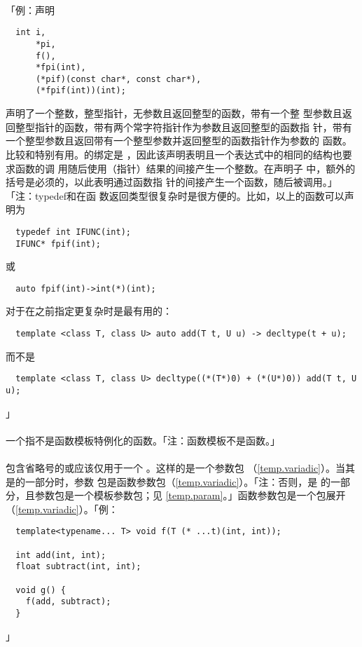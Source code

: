 \paragraph{}
「例：声明
\begin{lstlisting}
  int i,
      *pi,
      f(),
      *fpi(int),
      (*pif)(const char*, const char*),
      (*fpif(int))(int);
\end{lstlisting}
声明了一个整数，整型指针，无参数且返回整型的函数，带有一个整
型参数且返回整型指针的函数，带有两个常字符指针作为参数且返回整型的函数指
针，带有一个整型参数且返回带有一个整型参数并返回整型的函数指针作为参数的
函数。比较和特别有用。的绑定是
，因此该声明表明且一个表达式中的相同的结构也要求函数的调
用随后使用（指针）结果的间接产生一个整数。在声明子
中，额外的括号是必须的，以此表明通过函数指
针的间接产生一个函数，随后被调用。」「注：typedef和在函
数返回类型很复杂时是很方便的。比如，以上的函数可以声明为
\begin{lstlisting}
  typedef int IFUNC(int);
  IFUNC* fpif(int);
\end{lstlisting}
或
\begin{lstlisting}
  auto fpif(int)->int(*)(int);
\end{lstlisting}
对于在之前指定更复杂时是最有用的：
\begin{lstlisting}
  template <class T, class U> auto add(T t, U u) -> decltype(t + u);
\end{lstlisting}
而不是
\begin{lstlisting}
  template <class T, class U> decltype((*(T*)0) + (*(U*)0)) add(T t, U u);
\end{lstlisting}」

\paragraph{}
一个指不是函数模板特例化的函数。「注：函数模板不是函数。」

\paragraph{}
包含省略号的或应该仅用于一个
。这样的是一个参数包
（\ref{temp.variadic}）。当其是的一部分时，参数
包是函数参数包（\ref{temp.variadic}）。「注：否则，是
的一部分，且参数包是一个模板参数包；见
\ref{temp.param}。」函数参数包是一个包展开（\ref{temp.variadic}）。「例：
\begin{lstlisting}
  template<typename... T> void f(T (* ...t)(int, int));

  int add(int, int);
  float subtract(int, int);

  void g() {
    f(add, subtract);
  }
\end{lstlisting}」


